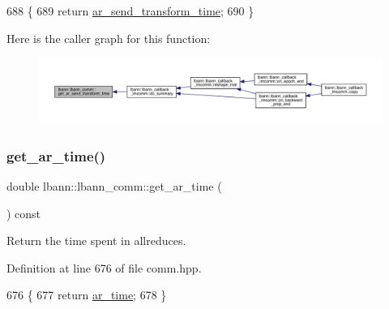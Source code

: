 \begin{DoxyCode}
688                                                    \{
689     \textcolor{keywordflow}{return} \hyperlink{classlbann_1_1lbann__comm_a4e3d35520a8f567579f9235e9808ba1c}{ar\_send\_transform\_time};
690   \}
\end{DoxyCode}
Here is the caller graph for this function\+:\nopagebreak
\begin{figure}[H]
\begin{center}
\leavevmode
\includegraphics[width=350pt]{classlbann_1_1lbann__comm_aed5d56c2b7205009c67ab37ea1c1556f_icgraph}
\end{center}
\end{figure}
\mbox{\label{classlbann_1_1lbann__comm_a29e966df9f8241bba47aa1663ce4151a}} 
\subsubsection{\texorpdfstring{get\+\_\+ar\+\_\+time()}{get\_ar\_time()}}
{\footnotesize\ttfamily double lbann\+::lbann\+\_\+comm\+::get\+\_\+ar\+\_\+time (\begin{DoxyParamCaption}{ }\end{DoxyParamCaption}) const\hspace{0.3cm}{\ttfamily [inline]}}

Return the time spent in allreduces. 

Definition at line 676 of file comm.\+hpp.


\begin{DoxyCode}
676                                     \{
677     \textcolor{keywordflow}{return} \hyperlink{classlbann_1_1lbann__comm_aa57d2fbeef85fd8a3c9f2a37ca7687c8}{ar\_time};
678   \}
\end{DoxyCode}
\mbox{\label{classlbann_1_1lbann__comm_aadc407cd170fc9da46cdc4483f424b2a}} 
